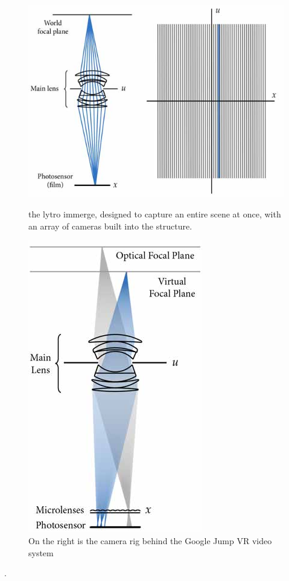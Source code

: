 \documentclass[12pt]{report}
\begin{document}
\begin{figure}[!ht]
	\centering
	\begin{minipage}{0.45\textwidth}
		\centering
		\includegraphics[scale=0.4]{ng_typical.png}
		\caption{the lytro immerge, designed to capture an entire scene at once, with an array of cameras built into the structure.}
		\label{fig:ng_typical}
	\end{minipage}\hfill
	\begin{minipage}{0.45\textwidth}
		\centering
		\includegraphics[scale=0.32]{ng_plenoptic.png}
		\caption{On the right is the camera rig behind the Google Jump VR video system \cite{Anderson16}}
		\label{fig:ng_plenoptic}
	\end{minipage}
\end{figure}.
\end{document}
